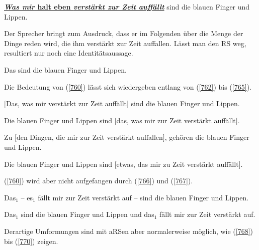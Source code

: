 \begin{exe}
	\ex\label{760} 
	\underline{\textbf{\textit{Was mir} halt eben \textit{verstärkt zur Zeit auffällt}}} sind die blauen Finger und Lippen.
\end{exe} 
Der Sprecher bringt zum Ausdruck, dass er im Folgenden über die Menge der Dinge reden wird, die ihm verstärkt zur Zeit auffallen. Lässt man den RS weg, resultiert nur noch eine Identitätsaussage.

\begin{exe}
	\ex\label{761} 
	Das sind die blauen Finger und Lippen.
\end{exe} 
Die Bedeutung von (\ref{760}) lässt sich wiedergeben entlang von (\ref{762}) bis (\ref{765}).

\begin{exe}
	\ex\label{762} 
	$[$Das, was mir verstärkt zur Zeit auffällt$]$ sind die blauen Finger und Lippen.		
\end{exe}
\vspace{-0.65cm}
\begin{exe}
	\ex\label{763} 
	Die blauen Finger und Lippen sind $[$das, was mir zur Zeit verstärkt auffällt$]$.		
\end{exe}
\vspace{-0.65cm}
\begin{exe}
	\ex\label{764} 
	Zu $[$den Dingen, die mir zur Zeit verstärkt auffallen$]$, gehören die blauen Finger und Lippen.		
\end{exe}	
\vspace{-0.65cm}
\begin{exe}
	\ex\label{765} 
	Die blauen Finger und Lippen sind $[$etwas, das mir zu Zeit verstärkt auffällt$]$.		
\end{exe}	
(\ref{760}) wird aber nicht aufgefangen durch (\ref{766}) und (\ref{767}).

\begin{exe}
	\ex\label{766} 
	Das$_{1}$ – es$_{1}$ fällt mir zur Zeit verstärkt auf – sind die blauen Finger und Lippen.		
\end{exe}
\vspace{-0.65cm}
\begin{exe}
	\ex\label{767} 
	Das$_{1}$ sind die blauen Finger und Lippen und das$_{1}$ fällt mir zur Zeit verstärkt auf.		
\end{exe}
Derartige Umformungen sind mit aRSen aber normalerweise möglich, wie (\ref{768}) bis (\ref{770}) zeigen.

